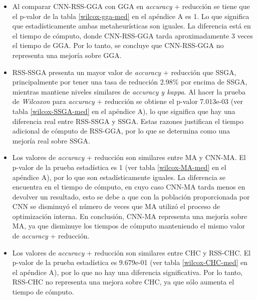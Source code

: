 \begin{itemize}
 
\item Al comparar CNN-RSS-GGA con GGA en \emph{accuracy} + reducción se tiene que el p-valor de la tabla \ref{wilcox-gga-med} en el apéndice A es 1. Lo que significa que estadísticamente ambas metaheurísticas son iguales. La diferencia está en el tiempo de cómputo, donde CNN-RSS-GGA tarda aproximadamente 3 veces el tiempo de GGA. Por lo tanto, se concluye que CNN-RSS-GGA no representa una mejoría sobre GGA.

\item RSS-SSGA presenta un mayor valor de \emph{accuracy} + reducción que SSGA, principalmente por tener una tasa de reducción 2.98\% por encima de SSGA, mientras mantiene niveles similares de \emph{accuracy y kappa}. Al hacer la prueba de \emph{Wilcoxon} para \emph{accuracy} + reducción se obtiene el p-valor 7.013e-03 (ver tabla \ref{wilcox-SSGA-med} en el apéndice A), lo que significa que hay una diferencia real entre RSS-SSGA y SSGA. Estas razones justifican el tiempo adicional de cómputo de RSS-GGA, por lo que se determina como una mejoría real sobre SSGA.

\item Los valores de \emph{accuracy} + reducción son similares entre MA y CNN-MA. El p-valor de la prueba estadística es 1 (ver tabla \ref{wilcox-MA-med} en el apéndice A), por lo que son estadísticamente iguales. La diferencia se encuentra en el tiempo de cómputo, en cuyo caso CNN-MA tarda menos en devolver un resultado, esto se debe a que con la población proporcionada por CNN se disminuyó el número de veces que MA utilizó el proceso de optimización interna. En conclusión, CNN-MA representa una mejoría sobre MA, ya que disminuye los tiempos de cómputo manteniendo el mismo valor de \emph{accuracy} + reducción.

\item  Los valores de \emph{accuracy} + reducción son similares entre CHC y RSS-CHC. El p-valor de la prueba estadística es 9.679e-01 (ver tabla \ref{wilcox-CHC-med} en el apéndice A), por lo que no hay una diferencia significativa. Por lo tanto, RSS-CHC no representa una mejora sobre CHC, ya que sólo aumenta el tiempo de cómputo.

\end{itemize}

